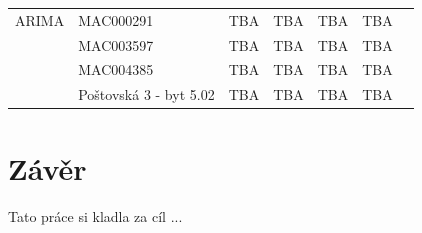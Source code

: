 \documentclass[FM,BP,fonts]{tulthesis}
\begin{document}
\begin{table}[!ht]
\begin{tabular}{lllllll}
		ARIMA           & MAC000291          & TBA            & TBA             & TBA        &  TBA            \\ 
		~               & MAC003597          & TBA            & TBA             & TBA            & TBA             \\  
		~               & MAC004385          & TBA            & TBA             & TBA           & TBA             \\ 
		~               & Poštovská 3 - byt 5.02              & TBA           & TBA             & TBA           & TBA \\   
		
		
	\end{tabular}
\end{table}


\chapter{Závěr}
Tato práce si kladla za cíl ... 



\printbibliography[title={Použitá literatura}] %

\end{document}
